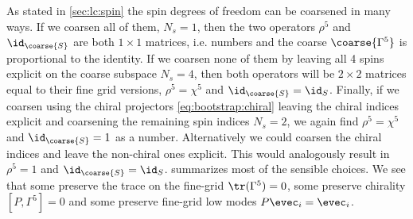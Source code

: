 As stated in \cref{sec:lc:spin} the spin degrees of freedom can be coarsened in many ways.
If we coarsen all of them, $N_s = 1$, then the two operators $\rho^{5}$ and $\id_{\coarse{S}}$ are both $1 \times 1$ matrices, i.e. numbers and the coarse $\coarse{\Gamma^5}$ is proportional to the identity.
If we coarsen none of them by leaving all \num{4} spins explicit on the coarse subspace $N_s = 4$, then both operators will be $2 \times 2$ matrices equal to their fine grid versions, $\rho^{5} = \chi^{5}$ and $\id_{\coarse{S}} = \id_S$.
Finally, if we coarsen using the chiral projectors \cref{eq:bootstrap:chiral} leaving the chiral indices explicit and coarsening the remaining spin indices $N_s=2$, we again find $\rho^{5} = \chi^{5}$ and $\id_{\coarse{S}} = 1$ as a number.
Alternatively we could coarsen the chiral indices and leave the non-chiral ones explicit.
This would analogously result in $\rho^{5} = 1$ and $\id_{\coarse{S}} = \id_S$.
 summarizes most of the sensible choices.
We see that some preserve the trace on the fine-grid $\tr(\Gamma^{5})=0$, some preserve chirality $[P, \Gamma^{5}] = 0$ and some preserve fine-grid low modes $P \evec_i = \evec_i$.


